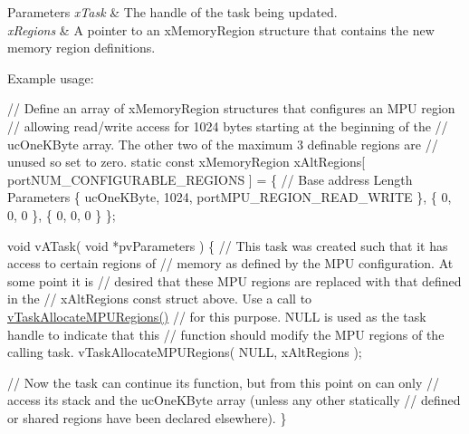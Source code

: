 \begin{DoxyParams}{Parameters}
{\em x\+Task} & The handle of the task being updated.\\
\hline
{\em x\+Regions} & A pointer to an x\+Memory\+Region structure that contains the new memory region definitions.\\
\hline
\end{DoxyParams}
Example usage\+: 
\begin{DoxyPre}
// Define an array of xMemoryRegion structures that configures an MPU region
// allowing read/write access for 1024 bytes starting at the beginning of the
// ucOneKByte array.  The other two of the maximum 3 definable regions are
// unused so set to zero.
static const xMemoryRegion xAltRegions[ portNUM\_CONFIGURABLE\_REGIONS ] =
\{
    // Base address     Length      Parameters
    \{ ucOneKByte,       1024,       portMPU\_REGION\_READ\_WRITE \},
    \{ 0,                0,          0 \},
    \{ 0,                0,          0 \}
\};\end{DoxyPre}



\begin{DoxyPre}void vATask( void *pvParameters )
\{
    // This task was created such that it has access to certain regions of
    // memory as defined by the MPU configuration.  At some point it is
    // desired that these MPU regions are replaced with that defined in the
    // xAltRegions const struct above.  Use a call to \hyperlink{task_8h_a4fd3da9cc010ebb08743f613763c7924}{vTaskAllocateMPURegions()}
    // for this purpose.  NULL is used as the task handle to indicate that this
    // function should modify the MPU regions of the calling task.
    vTaskAllocateMPURegions( NULL, xAltRegions );\end{DoxyPre}



\begin{DoxyPre}    // Now the task can continue its function, but from this point on can only
    // access its stack and the ucOneKByte array (unless any other statically
    // defined or shared regions have been declared elsewhere).
\}
   \end{DoxyPre}
 